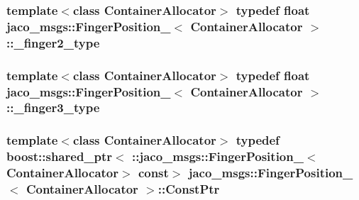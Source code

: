 \subsubsection[{\texorpdfstring{\+\_\+finger2\+\_\+type}{_finger2_type}}]{\setlength{\rightskip}{0pt plus 5cm}template$<$class Container\+Allocator$>$ typedef float {\bf jaco\+\_\+msgs\+::\+Finger\+Position\+\_\+}$<$ Container\+Allocator $>$\+::{\bf \+\_\+finger2\+\_\+type}}\hypertarget{structjaco__msgs_1_1FingerPosition___afef383694b756f484b98bdd8d8b4c945}{}\label{structjaco__msgs_1_1FingerPosition___afef383694b756f484b98bdd8d8b4c945}
\subsubsection[{\texorpdfstring{\+\_\+finger3\+\_\+type}{_finger3_type}}]{\setlength{\rightskip}{0pt plus 5cm}template$<$class Container\+Allocator$>$ typedef float {\bf jaco\+\_\+msgs\+::\+Finger\+Position\+\_\+}$<$ Container\+Allocator $>$\+::{\bf \+\_\+finger3\+\_\+type}}\hypertarget{structjaco__msgs_1_1FingerPosition___a0efba96ee62a6a41fe83c572572a4170}{}\label{structjaco__msgs_1_1FingerPosition___a0efba96ee62a6a41fe83c572572a4170}
\subsubsection[{\texorpdfstring{Const\+Ptr}{ConstPtr}}]{\setlength{\rightskip}{0pt plus 5cm}template$<$class Container\+Allocator$>$ typedef boost\+::shared\+\_\+ptr$<$ \+::{\bf jaco\+\_\+msgs\+::\+Finger\+Position\+\_\+}$<$Container\+Allocator$>$ const$>$ {\bf jaco\+\_\+msgs\+::\+Finger\+Position\+\_\+}$<$ Container\+Allocator $>$\+::{\bf Const\+Ptr}}\hypertarget{structjaco__msgs_1_1FingerPosition___aa5251615a131d806203aed481d508ed1}{}\label{structjaco__msgs_1_1FingerPosition___aa5251615a131d806203aed481d508ed1}
